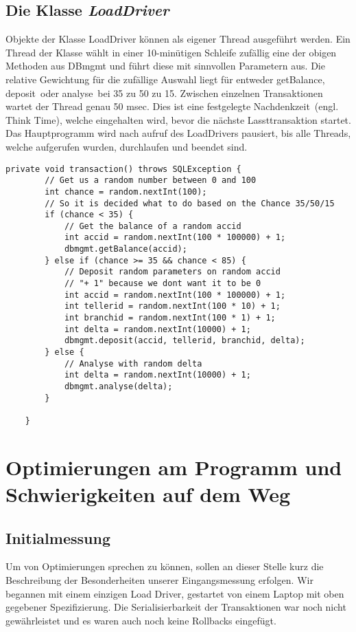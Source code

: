 \documentclass[a4paper, bibliography=totoc, 12pt]{scrartcl}
\begin{document}
	\subsection{Die Klasse \emph{LoadDriver}}
	Objekte der Klasse LoadDriver können als eigener Thread ausgeführt werden. Ein Thread der Klasse wählt in einer 10-minütigen Schleife zufällig eine der obigen Methoden aus DBmgmt und führt diese mit sinnvollen Parametern aus. Die relative Gewichtung für die zufällige Auswahl liegt für entweder \glqq getBalance\grqq , \glqq deposit\grqq\ oder \glqq analyse\grqq\ bei 35 zu 50 zu 15. Zwischen einzelnen Transaktionen wartet der Thread genau 50 msec. Dies ist eine festgelegte \glqq Nachdenkzeit\grqq\ (engl. Think Time), welche eingehalten wird, bevor die nächste Lassttransaktion startet.
Das Hauptprogramm wird nach aufruf des LoadDrivers pausiert, bis alle Threads, welche aufgerufen wurden, durchlaufen und beendet sind.
	\begin{lstlisting}
private void transaction() throws SQLException {
		// Get us a random number between 0 and 100
		int chance = random.nextInt(100);
		// So it is decided what to do based on the Chance 35/50/15
		if (chance < 35) {
			// Get the balance of a random accid
			int accid = random.nextInt(100 * 100000) + 1;
			dbmgmt.getBalance(accid);
		} else if (chance >= 35 && chance < 85) {
			// Deposit random parameters on random accid
			// "+ 1" because we dont want it to be 0
			int accid = random.nextInt(100 * 100000) + 1;
			int tellerid = random.nextInt(100 * 10) + 1;
			int branchid = random.nextInt(100 * 1) + 1;
			int delta = random.nextInt(10000) + 1;
			dbmgmt.deposit(accid, tellerid, branchid, delta);
		} else {
			// Analyse with random delta
			int delta = random.nextInt(10000) + 1;
			dbmgmt.analyse(delta);
		}
		
	}
	\end{lstlisting}

\section{Optimierungen am Programm und Schwierigkeiten auf dem Weg}
	\subsection{Initialmessung}
	Um von Optimierungen sprechen zu können, sollen an dieser Stelle kurz die Beschreibung der Besonderheiten unserer Eingangsmessung erfolgen. Wir begannen mit einem einzigen Load Driver, gestartet von einem Laptop mit oben gegebener Spezifizierung. Die Serialisierbarkeit der Transaktionen war noch nicht gewährleistet und es waren auch noch keine Rollbacks eingefügt. 
	
\end{document}
